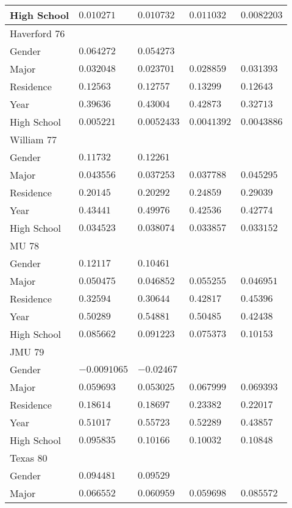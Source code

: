 \begin{center}
\begin{longtable}{|l|l|l|l|l|}
High School & $0.010271$ & $0.010732$ & $0.011032$ & $0.0082203$ \\ \hline \hline
Haverford $76$ & & &   \\ \hline
Gender & $0.064272$ & $0.054273$ & & \\
Major & $0.032048$ & $0.023701$ & $0.028859$ & $0.031393$ \\
Residence & $0.12563$ & $0.12757$ & $0.13299$ & $0.12643$ \\
Year & $0.39636$ & $0.43004$ & $0.42873$ & $0.32713$ \\
High School & $0.005221$ & $0.0052433$ & $0.0041392$ & $0.0043886$ \\ \hline \hline
William $77$ & & &   \\ \hline
Gender & $0.11732$ & $0.12261$ & & \\
Major & $0.043556$ & $0.037253$ & $0.037788$ & $0.045295$ \\
Residence & $0.20145$ & $0.20292$ & $0.24859$ & $0.29039$ \\
Year & $0.43441$ & $0.49976$ & $0.42536$ & $0.42774$ \\
High School & $0.034523$ & $0.038074$ & $0.033857$ & $0.033152$ \\ \hline \hline
MU $78$ & & &   \\ \hline
Gender & $0.12117$ & $0.10461$ & & \\
Major & $0.050475$ & $0.046852$ & $0.055255$ & $0.046951$ \\
Residence & $0.32594$ & $0.30644$ & $0.42817$ & $0.45396$ \\
Year & $0.50289$ & $0.54881$ & $0.50485$ & $0.42438$ \\
High School & $0.085662$ & $0.091223$ & $0.075373$ & $0.10153$ \\ \hline \hline
JMU $79$ & & &   \\ \hline
Gender & $-0.0091065$ & $-0.02467$ & & \\
Major & $0.059693$ & $0.053025$ & $0.067999$ & $0.069393$ \\
Residence & $0.18614$ & $0.18697$ & $0.23382$ & $0.22017$ \\
Year & $0.51017$ & $0.55723$ & $0.52289$ & $0.43857$ \\
High School & $0.095835$ & $0.10166$ & $0.10032$ & $0.10848$ \\ \hline \hline
Texas $80$ & & &   \\ \hline
Gender & $0.094481$ & $0.09529$ & & \\
Major & $0.066552$ & $0.060959$ & $0.059698$ & $0.085572$ \\

\end{longtable}
\end{center}
